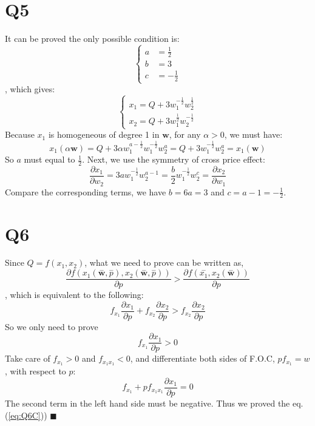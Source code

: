 \documentclass{article}
\begin{document}
\section*{Q5}
It can be proved the only possible condition is:
\begin{equation}
	\begin{cases}
		a &= \frac{1}{2}\\
		b &= 3 \\
		c &= -\frac{1}{2}	
	\end{cases}
\end{equation}
, which gives:
\begin{equation}
	\begin{cases}
		x_1 = Q + 3w^{-\frac{1}{2}}_1 w^{\frac{1}{2}}_2		\\
		x_2 = Q + 3w^{\frac{1}{2}}_1 w^{-\frac{1}{2}}_2	
	\end{cases}
\end{equation}
Because $x_1$ is homogeneous of degree 1 in $\bm{w}$, for any $\alpha >0$, we must have:
\begin{equation}
	x_1(\alpha \bm{w}) = Q + 3\alpha w^ {a-\frac{1}{2}}_1 w^{-\frac{1}{2}}_1 w^{a}_2	 = Q + 3w^{-\frac{1}{2}}_1 w^{a}_2 = x_1(\bm{w})  
\end{equation}
So $a$ must equal to $\frac{1}{2}$. Next, we use the symmetry of cross price effect:
\begin{equation}
 	\frac{\partial x_1}{\partial w_2} = 3aw^{-\frac{1}{2}}_1 w_2^{a-1} = \frac{b}{2} w^{-\frac{1}{2}}_1 w_2^{c} = \frac{\partial x_2}{\partial w_1}
 \end{equation} 
 Compare the corresponding terms, we have $b = 6a =3 $ and $c=a-1=-\frac{1}{2}$.\quad{$\blacksquare$}


\section*{Q6}
Since $Q = f(x_1,x_2)$, what we need to prove can be written as,
\begin{equation}
	\frac{\partial f(x_1(\overset{-}{\bm{w}},\overset{-}{p}),x_2(\overset{-}{\bm{w}},\overset{-}{p}))}{\partial p} > 
	\frac{\partial f(\overset{-}{x_1}, x_2(\overset{-}{\bm{w}}))}
	{\partial p}
	\end{equation}
, which is equivalent to the following:
\begin{equation}
	f_{x_1}\frac{\partial x_1}{\partial p} +f_{x_2}\frac{\partial x_2}{\partial p}
	> f_{x_2}\frac{\partial x_2}{\partial p}
\end{equation}
So we only need to prove 
\begin{equation}\label{eq:Q6C}
	f_{x_1}\frac{\partial x_1}{\partial p} > 0 
\end{equation}
Take care of $f_{x_1}>0$ and $f_{x_1 x_1}<0$, and differentiate both sides of F.O.C, $pf_{x_1} = w$, with respect to $p$:
\begin{equation}
	f_{x_1} + pf_{x_1 x_1} \frac{\partial x_1}{\partial p} = 0
\end{equation}
The second term in the left hand side must be negative. Thus we proved the eq.(\ref{eq:Q6C})) $\blacksquare$

% 
\end{document}
